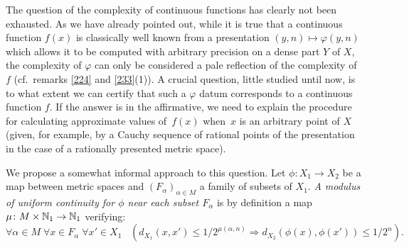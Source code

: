 The question of the complexity of continuous functions has clearly not been exhausted. 
As we have already pointed out, while it is true that a continuous function $f(x)$ is classically well known from a presentation $(y, n) \mapsto \varphi(y,n)$ which allows it to be computed with arbitrary precision on a dense part $Y$ of $X$, the complexity of $\varphi$ can only be considered a pale reflection of the complexity of $f$ (cf.\ remarks \ref{224} and \ref{233}(1)).
A crucial question, little studied until now, is to what extent we can certify that such a $\varphi$ datum corresponds to a continuous function $f$. If the answer is in the affirmative, we need to explain the procedure for calculating approximate values of~$f(x)$ when~$x$ is an arbitrary point of $X$ (given, for example, by a Cauchy sequence of rational points of the presentation in the case of a rationally presented metric space).

\noindent 
We propose a somewhat informal approach to this question.
Let $\phi\colon X_1 \to X_2$ be a map between metric spaces and $(F_{\alpha})_{\alpha \in M}$ a family of subsets of $X_1$. \emph{A modulus of uniform continuity for $\phi$ near each subset $F_{\alpha}$} is by definition a map $\mu \colon M \times \mathbb {N}_1 \to \mathbb {N}_1$ verifying:	
\[ 
\forall \alpha \in M \; \forall x \in F_{\alpha} \; \forall x'\in X_1\; \; \; \left(d_{X_1}(x,x') 
\leq 1/2^{\mu(\alpha,n)} \Rightarrow d_{X_2}(\phi(x),\phi(x'))
 \leq 1/2^n \right).
\]
 
